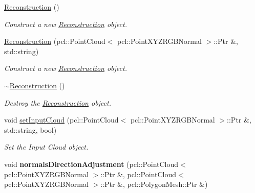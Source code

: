 \begin{DoxyCompactItemize}
\item 
\mbox{\label{classReconstruction_a081657a94b56a22f530f6661f356906a}} 
\hyperlink{classReconstruction_a081657a94b56a22f530f6661f356906a}{Reconstruction} ()
\begin{DoxyCompactList}\small\item\em Construct a new \hyperlink{classReconstruction}{Reconstruction} object. \end{DoxyCompactList}\item 
\hyperlink{classReconstruction_ac7ac62559b5825dcec2a760946897f40}{Reconstruction} (pcl\+::\+Point\+Cloud$<$ pcl\+::\+Point\+X\+Y\+Z\+R\+G\+B\+Normal $>$\+::Ptr \&, std\+::string)
\begin{DoxyCompactList}\small\item\em Construct a new \hyperlink{classReconstruction}{Reconstruction} object. \end{DoxyCompactList}\item 
\mbox{\label{classReconstruction_a039a0f69fa30bd88ffadf608846a316d}} 
\hyperlink{classReconstruction_a039a0f69fa30bd88ffadf608846a316d}{$\sim$\+Reconstruction} ()
\begin{DoxyCompactList}\small\item\em Destroy the \hyperlink{classReconstruction}{Reconstruction} object. \end{DoxyCompactList}\item 
\mbox{\label{classReconstruction_a8be86587dfe645c245474315ae67f5e4}} 
void \hyperlink{classReconstruction_a8be86587dfe645c245474315ae67f5e4}{set\+Input\+Cloud} (pcl\+::\+Point\+Cloud$<$ pcl\+::\+Point\+X\+Y\+Z\+R\+G\+B\+Normal $>$\+::Ptr \&, std\+::string, bool)
\begin{DoxyCompactList}\small\item\em Set the Input Cloud object. \end{DoxyCompactList}\item 
\mbox{\label{classReconstruction_a16d79600ed8684f67c1c56456bd9142b}} 
void {\bfseries normals\+Direction\+Adjustment} (pcl\+::\+Point\+Cloud$<$ pcl\+::\+Point\+X\+Y\+Z\+R\+G\+B\+Normal $>$\+::Ptr \&, pcl\+::\+Point\+Cloud$<$ pcl\+::\+Point\+X\+Y\+Z\+R\+G\+B\+Normal $>$\+::Ptr \&, pcl\+::\+Polygon\+Mesh\+::\+Ptr \&)

\end{DoxyCompactItemize}
